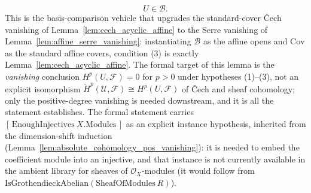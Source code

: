 \begin{lemma}
\[      U \in \mathcal{B}.
  \]
  This is the basis-comparison vehicle that upgrades the standard-cover {\v C}ech
  vanishing of Lemma~\ref{lem:cech_acyclic_affine} to the Serre vanishing of
  Lemma~\ref{lem:affine_serre_vanishing}: instantiating \(\mathcal{B}\) as the affine
  opens and \(\mathrm{Cov}\) as the standard affine covers, condition (3) is exactly
  Lemma~\ref{lem:cech_acyclic_affine}. The formal target of this lemma is the
  \emph{vanishing} conclusion \(H^p(U, \mathcal{F}) = 0\) for \(p > 0\) under
  hypotheses (1)--(3), not an explicit isomorphism \(\check{H}^p(\mathcal{U},
  \mathcal{F}) \cong H^p(U, \mathcal{F})\) of {\v C}ech and sheaf cohomology; only
  the positive-degree vanishing is needed downstream, and it is all the statement
  establishes. The formal statement carries
  \([\,\mathrm{EnoughInjectives}\ X.\mathrm{Modules}\,]\) as an explicit instance hypothesis,
  inherited from the dimension-shift induction (Lemma~\ref{lem:absolute_cohomology_pos_vanishing}):
  it is needed to embed the coefficient module into an injective, and that instance is not currently
  available in the ambient library for sheaves of \(\mathcal{O}_X\)-modules (it would follow from
  \(\mathrm{IsGrothendieckAbelian}(\mathrm{SheafOfModules}\ R)\)).
\end{lemma}

